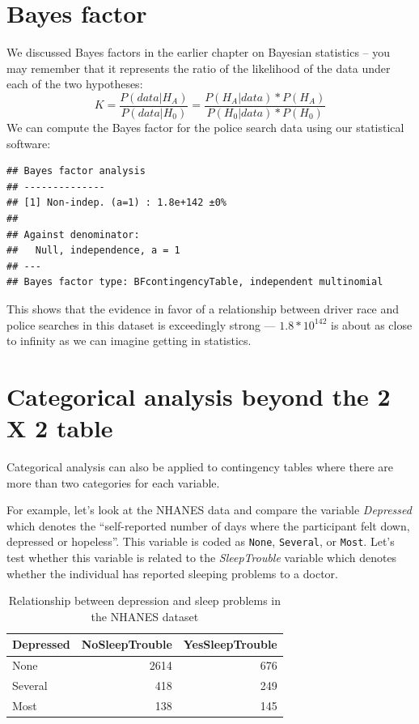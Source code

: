\documentclass[12pt,]{book}
\theoremstyle{definition}
\theoremstyle{definition}
\theoremstyle{definition}
\theoremstyle{remark}
\begin{document}
\hypertarget{bayes-factor}{%
\section{Bayes factor}\label{bayes-factor}}

We discussed Bayes factors in the earlier chapter on Bayesian statistics -- you may remember that it represents the ratio of the likelihood of the data under each of the two hypotheses:
\[ 
K = \frac{P(data|H_A)}{P(data|H_0)} = \frac{P(H_A|data)*P(H_A)}{P(H_0|data)*P(H_0)}
\]
We can compute the Bayes factor for the police search data using our statistical software:

\begin{verbatim}
## Bayes factor analysis
## --------------
## [1] Non-indep. (a=1) : 1.8e+142 ±0%
## 
## Against denominator:
##   Null, independence, a = 1 
## ---
## Bayes factor type: BFcontingencyTable, independent multinomial
\end{verbatim}

This shows that the evidence in favor of a relationship between driver race and police searches in this dataset is exceedingly strong --- \(1.8 * 10^{142}\) is about as close to infinity as we can imagine getting in statistics.

\hypertarget{categorical-analysis-beyond-the-2-x-2-table}{%
\section{Categorical analysis beyond the 2 X 2 table}\label{categorical-analysis-beyond-the-2-x-2-table}}

Categorical analysis can also be applied to contingency tables where there are more than two categories for each variable.

For example, let's look at the NHANES data and compare the variable \emph{Depressed} which denotes the ``self-reported number of days where the participant felt down, depressed or hopeless''. This variable is coded as \texttt{None}, \texttt{Several}, or \texttt{Most}. Let's test whether this variable is related to the \emph{SleepTrouble} variable which denotes whether the individual has reported sleeping problems to a doctor.

\begin{table}

\caption{\label{tab:unnamed-chunk-68}Relationship between depression and sleep problems in the NHANES dataset}
\centering
\begin{tabular}[t]{l|r|r}
\hline
Depressed & NoSleepTrouble & YesSleepTrouble\\
\hline
None & 2614 & 676\\
\hline
Several & 418 & 249\\
\hline
Most & 138 & 145\\
\hline
\end{tabular}
\end{table}
\end{document}
